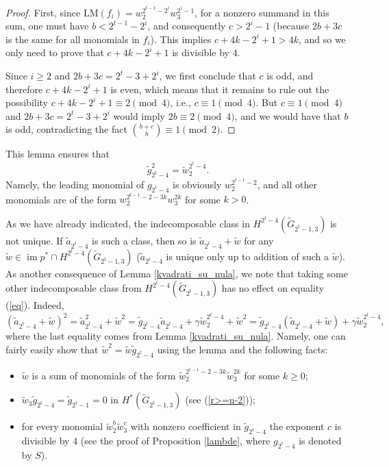 \documentclass{amsart}
\newcommand{\im}{\operatorname{im}}
\theoremstyle{definition}
\theoremstyle{remark}
\numberwithin{equation}{section}
\begin{document}
\begin{proof}
First, since $\mathrm{LM}(f_i)=w_2^{2^{t-1}-2^i}w_3^{2^i-1}$, for a nonzero summand in this sum, one must have $b<2^{t-1}-2^i$, and consequently $c>2^i-1$ (because $2b+3c$ is the same for all monomials in $f_i$). This implies $c+4k-2^i+1>4k$, and so we only need to prove that $c+4k-2^i+1$ is divisible by $4$.

Since $i\ge2$ and $2b+3c=2^t-3+2^i$, we first conclude that $c$ is odd, and therefore $c+4k-2^i+1$ is even, which means that it remains to rule out the possibility $c+4k-2^i+1\equiv2\pmod4$, i.e., $c\equiv1\pmod4$. But $c\equiv1\pmod4$ and $2b+3c=2^t-3+2^i$ would imply $2b\equiv2\pmod4$, and we would have that $b$ is odd, contradicting the fact ${b+c\choose b}\equiv1\pmod2$.
\end{proof}

This lemma ensures that
\begin{equation}\label{g_na_kvadrat}
\widetilde g_{2^t-4}^2=\widetilde w_2^{2^t-4}.
\end{equation}
Namely, the leading monomial of $g_{2^t-4}$ is obviously $w_2^{2^{t-1}-2}$, and all other monomials are of the form $w_2^{2^{t-1}-2-3k}w_3^{2k}$ for some $k>0$.

As we have already indicated, the indecomposable class in $H^{2^t-4}(\widetilde G_{2^t-1,3})$ is not unique. If $\widetilde a_{2^t-4}$ is such a class, then so is $\widetilde a_{2^t-4}+\widetilde w$ for any $\widetilde w\in\im p^*\cap H^{2^t-4}(\widetilde G_{2^t-1,3})$ ($\widetilde a_{2^t-4}$ is unique only up to addition of such a $\widetilde w$). As another consequence of Lemma \ref{kvadrati_su_nula}, we note that taking some other indecomposable class from $H^{2^t-4}(\widetilde G_{2^t-1,3})$ has no effect on equality (\ref{eq}). Indeed, 
\[(\widetilde a_{2^t-4}+\widetilde w)^2=\widetilde a_{2^t-4}^2+\widetilde w^2=\widetilde g_{2^t-4}\widetilde a_{2^t-4}+\gamma\widetilde w_2^{2^t-4}+\widetilde w^2=\widetilde g_{2^t-4}(\widetilde a_{2^t-4}+\widetilde w)+\gamma\widetilde w_2^{2^t-4},\]
where the last equality comes from Lemma \ref{kvadrati_su_nula}. Namely, one can fairly easily show that $\widetilde w^2=\widetilde w\widetilde g_{2^t-4}$ using the lemma and the following facts: 
\begin{itemize}
    \item $\widetilde w$ is a sum of monomials of the form $\widetilde w_2^{2^{t-1}-2-3k}\widetilde w_3^{2k}$ for some $k\ge0$; 
    \item $\widetilde w_3\widetilde g_{2^t-4}=\widetilde g_{2^t-1}=0$ in $H^*(\widetilde G_{2^t-1,3})$ (see (\ref{r>=n-2})); 
    \item for every monomial $\widetilde w_2^b\widetilde w_3^c$ with nonzero coefficient in $\widetilde g_{2^t-4}$ the exponent $c$ is divisible by $4$ (see the proof of Proposition \ref{lambde}, where $g_{2^t-4}$ is denoted by $S$).

\end{itemize}
\end{document}
